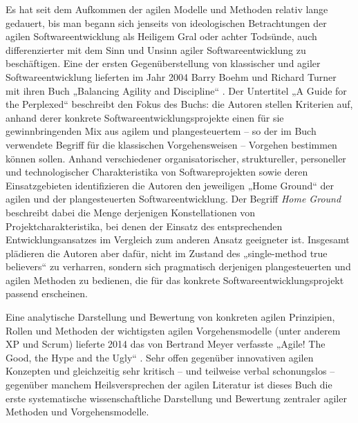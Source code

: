 Es hat seit dem Aufkommen der agilen Modelle und Methoden relativ lange gedauert, bis man begann sich jenseits von ideologischen Betrachtungen der agilen Softwareentwicklung als Heiligem Gral oder achter Todsünde, auch differenzierter mit dem Sinn und Unsinn agiler Softwareentwicklung zu beschäftigen. Eine der ersten Gegenüberstellung von klassischer und agiler Softwareentwicklung lieferten im Jahr 2004 Barry Boehm und Richard Turner mit ihren Buch „Balancing Agility and Disci\-pline“ \cite{boe04}. Der Untertitel „A Guide for the Perplexed“ beschreibt den Fokus des Buchs: die Autoren stellen Kriterien auf, anhand derer konkrete Software\-entwicklungs\-projekte einen für sie gewinnbringenden Mix aus agilem und plangesteuertem – so der im Buch verwendete Begriff für die klassischen Vorgehensweisen – Vorgehen bestimmen können sollen. Anhand verschiedener organisatorischer, struktureller, personeller und technologischer Charakteristika von Softwareprojekten sowie deren Einsatzgebieten identifizieren die Autoren den jeweiligen „Home Ground“ der agilen und der plangesteuerten Softwareentwicklung. Der Begriff \textit{Home Ground} 
beschreibt dabei die Menge derjenigen Konstellationen von Projektcharakteristika, bei denen der Einsatz des entsprechenden Entwicklungsansatzes im Vergleich zum anderen Ansatz geeigneter ist. Insgesamt plädieren die Autoren aber dafür, nicht im Zustand des „single-method true believers“ \cite[22]{boe04} zu verharren, sondern sich pragmatisch derjenigen plangesteuerten und agilen Methoden zu bedienen, die für das konkrete Softwareentwicklungsprojekt passend erscheinen.

\vspace{3mm} %


\vspace{3mm} %

Eine analytische Darstellung und Bewertung von konkreten agilen Prinzipien, Rollen und Methoden der wichtigsten agilen Vorgehensmodelle (unter anderem XP und Scrum) lieferte 2014 das von Bertrand Meyer verfasste „Agile! The Good, the \mbox{Hype} and the Ugly“ \cite{mey14}. Sehr offen gegenüber innovativen agilen Konzepten und gleichzeitig sehr kritisch – und teilweise verbal schonungslos – gegenüber manchem Heilsversprechen der agilen Literatur ist dieses Buch die erste systematische wissenschaftliche Darstellung und Bewertung zentraler agiler Methoden und Vorgehensmodelle.

